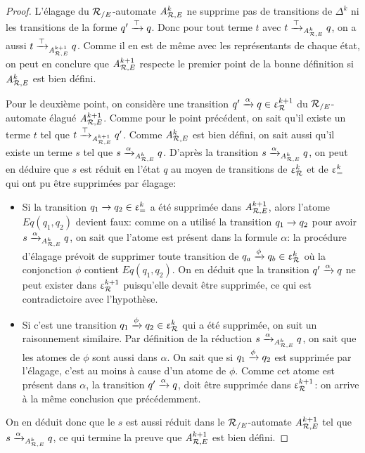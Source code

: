 \begin{proof}
L'élagage du ${\mathcal R_{/E}}$-automate ${\mathit A}_{\mathcal R,E}^k$ ne supprime pas de transitions de $\Delta^k$
ni les transitions de la forme $q'\xrightarrow{\top} q$. Donc pour tout terme $t$ avec
$t \xrightarrow{\top}_{{\mathit A}_{\mathcal R,E}^k} q$, on a aussi $t \xrightarrow{\top}_{{\mathit A}_{\mathcal R,E}^{k+1}} q$. Comme il en est de même
avec les représentants de chaque état, on peut en conclure que ${\mathit A}_{\mathcal R,E}^{k+1}$ respecte le premier
point de la bonne définition si ${\mathit A}_{\mathcal R,E}^k$ est bien défini.

Pour le deuxième point, on considère une transition $q' \xrightarrow{\alpha} q \in \upvarepsilon_{\mathcal R}^{k+1}$ du ${\mathcal R_{/E}}$-automate
élagué ${\mathit A}_{\mathcal R,E}^{k+1}$.
Comme pour le point précédent, on sait qu'il existe un terme $t$ tel que $t \xrightarrow{\top}_{{\mathit A}_{\mathcal R,E}^{k+1}} q'$. 
Comme ${\mathit A}_{\mathcal R,E}^{k}$ est bien défini, on sait aussi qu'il existe un terme $s$ tel que $s \xrightarrow{\alpha}_{{\mathit A}_{\mathcal R,E}^k} q$.
D'après la transition $s \xrightarrow{\alpha}_{{\mathit A}_{\mathcal R,E}^k} q$, on peut en déduire que $s$ est réduit en l'état $q$
au moyen de transitions de $\upvarepsilon_{\mathcal R}^k$ et de $\upvarepsilon_{=}^k$ qui ont pu être supprimées par élagage:
\begin{itemize}
\item 
  Si la transition $q_1 \rightarrow q_2 \in \upvarepsilon_{=}^k$ a été supprimée dans ${\mathit A}_{\mathcal R,E}^{k+1}$, alors l'atome $Eq(q_1,q_2)$
devient faux: comme on a utilisé la transition $q_1 \rightarrow q_2$ pour avoir $s \xrightarrow{\alpha}_{{\mathit A}_{\mathcal R,E}^k} q$,
on sait que l'atome est présent dans la formule $\alpha$: la procédure d'élagage prévoit de supprimer 
toute transition de $q_a \xrightarrow{\phi} q_b \in \upvarepsilon_{\mathcal R}^k$ où la conjonction $\phi$ contient  $Eq(q_1,q_2)$.
On en déduit que la transition $q' \xrightarrow{\alpha} q$ ne peut exister dans $\upvarepsilon_{\mathcal R}^{k+1}$ puisqu'elle devait être supprimée,
ce qui est contradictoire avec l'hypothèse.
\item 
  Si c'est une transition $q_1 \xrightarrow{\phi} q_2 \in \upvarepsilon_{\mathcal R}^k$ qui a été supprimée, on suit un raisonnement similaire.
  Par définition de la réduction $s \xrightarrow{\alpha}_{{\mathit A}_{\mathcal R,E}^k} q$, on sait que les atomes de $\phi$ sont aussi
  dans $\alpha$.  On sait que si $q_1 \xrightarrow{\phi} q_2$ est supprimée par l'élagage, c'est au moins à cause d'un atome
  de $\phi$. Comme cet atome est présent dans $\alpha$, la transition $q' \xrightarrow{\alpha} q$, doit être supprimée dans 
  $\upvarepsilon_{\mathcal R}^{k+1}$: on arrive à la même conclusion que précédemment.
\end{itemize}
On en déduit donc que le $s$ est aussi réduit dans le ${\mathcal R_{/E}}$-automate ${\mathit A}_{\mathcal R,E}^{k+1}$ tel que $s \xrightarrow{\alpha}_{{\mathit A}_{\mathcal R,E}^k} q$,
ce qui termine la preuve que ${\mathit A}_{\mathcal R,E}^{k+1}$ est bien défini.
\end{proof}

